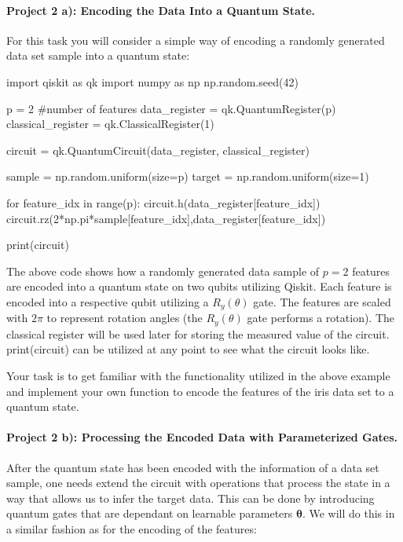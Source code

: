 \documentclass[%
oneside,                 %
final,                   %
10pt]{article}
\begin{document}
\paragraph{Project 2 a): Encoding the Data Into a Quantum State.}
For this task you will consider a simple way of encoding a randomly generated data set sample into a quantum state:

\begin{print}
import qiskit as qk
import numpy as np
np.random.seed(42)

p = 2 #number of features
data_register = qk.QuantumRegister(p)
classical_register = qk.ClassicalRegister(1)

circuit = qk.QuantumCircuit(data_register, classical_register)

sample = np.random.uniform(size=p)
target = np.random.uniform(size=1)

for feature_idx in range(p):
    circuit.h(data_register[feature_idx])
    circuit.rz(2*np.pi*sample[feature_idx],data_register[feature_idx])

print(circuit)
\end{print}

The above code shows how a randomly generated data sample of $p=2$
features are encoded into a quantum state on two qubits utilizing
Qiskit. Each feature is encoded into a respective qubit utilizing a
$R_y(\theta)$ gate. The features are scaled with $2\pi$ to represent
rotation angles (the $R_y(\theta)$ gate performs a rotation). The
classical register will be used later for storing the measured value
of the circuit.  print(circuit) can be utilized at any point to see
what the circuit looks like.



Your task is to get familiar with the functionality utilized in the
above example and implement your own function to encode the
features of the iris data set to a quantum state.


\paragraph{Project 2 b): Processing the Encoded Data with Parameterized Gates.}
After the quantum state has been encoded with the information of a data set sample, one needs extend the circuit with operations that process the state in a way that allows us to infer the target data. This can be done by introducing quantum gates that are dependant on learnable parameters $\boldsymbol{\theta}$. We will do this in a similar fashion as for the encoding of the features:
\end{document}
